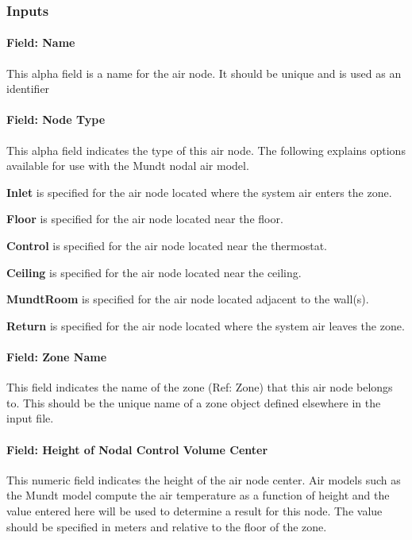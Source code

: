 \subsubsection{Inputs}\label{inputs-6-022}

\paragraph{Field: Name}\label{field-name-6-018}

This alpha field is a name for the air node. It should be unique and is used as an identifier

\paragraph{Field: Node Type}\label{field-node-type}

This alpha field indicates the type of this air node. The following explains options available for use with the Mundt nodal air model.

\textbf{Inlet} is specified for the air node located where the system air enters the zone.

\textbf{Floor} is specified for the air node located near the floor.

\textbf{Control} is specified for the air node located near the thermostat.

\textbf{Ceiling} is specified for the air node located near the ceiling.

\textbf{MundtRoom} is specified for the air node located adjacent to the wall(s).

\textbf{Return} is specified for the air node located where the system air leaves the zone.

\paragraph{Field: Zone Name}\label{field-zone-name-2-006}

This field indicates the name of the zone (Ref: Zone) that this air node belongs to. This should be the unique name of a zone object defined elsewhere in the input file.

\paragraph{Field: Height of Nodal Control Volume Center}\label{field-height-of-nodal-control-volume-center}

This numeric field indicates the height of the air node center. Air models such as the Mundt model compute the air temperature as a function of height and the value entered here will be used to determine a result for this node. The value should be specified in meters and relative to the floor of the zone.

